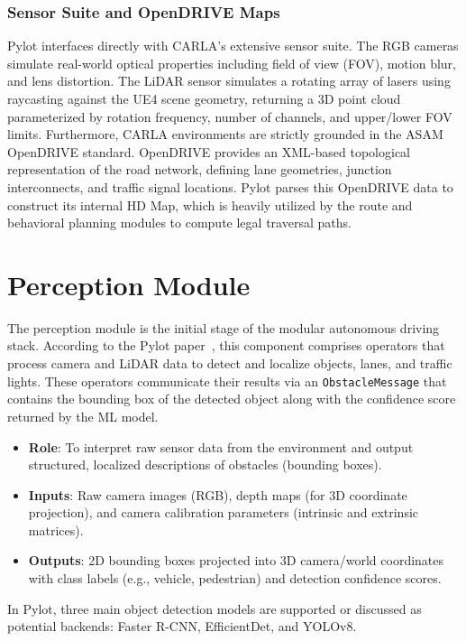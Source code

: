 \documentclass[11pt,a4paper]{report}
\begin{document}
\subsubsection{Sensor Suite and OpenDRIVE Maps}
Pylot interfaces directly with CARLA's extensive sensor suite. The RGB cameras simulate real-world optical properties including field of view (FOV), motion blur, and lens distortion. The LiDAR sensor simulates a rotating array of lasers using raycasting against the UE4 scene geometry, returning a 3D point cloud parameterized by rotation frequency, number of channels, and upper/lower FOV limits. Furthermore, CARLA environments are strictly grounded in the ASAM OpenDRIVE standard. OpenDRIVE provides an XML-based topological representation of the road network, defining lane geometries, junction interconnects, and traffic signal locations. Pylot parses this OpenDRIVE data to construct its internal HD Map, which is heavily utilized by the route and behavioral planning modules to compute legal traversal paths.

\section{Perception Module}
\label{sec:perception}
The perception module is the initial stage of the modular autonomous driving stack. According to the Pylot paper~\cite{erdos_pylot}, this component comprises operators that process camera and LiDAR data to detect and localize objects, lanes, and traffic lights. These operators communicate their results via an \texttt{ObstacleMessage} that contains the bounding box of the detected object along with the confidence score returned by the ML model.
\begin{itemize}
    \item \textbf{Role}: To interpret raw sensor data from the environment and output structured, localized descriptions of obstacles (bounding boxes).
    \item \textbf{Inputs}: Raw camera images (RGB), depth maps (for 3D coordinate projection), and camera calibration parameters (intrinsic and extrinsic matrices).
    \item \textbf{Outputs}: 2D bounding boxes projected into 3D camera/world coordinates with class labels (e.g., vehicle, pedestrian) and detection confidence scores.
\end{itemize}
In Pylot, three main object detection models are supported or discussed as potential backends: Faster R-CNN, EfficientDet, and YOLOv8.
\end{document}
